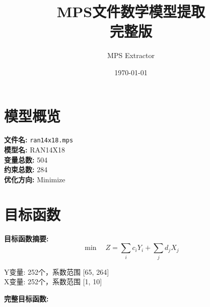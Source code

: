 \documentclass[a4paper,10pt]{article}
\title{MPS文件数学模型提取\\{\large 完整版}}
\author{MPS Extractor}
\date{\today}
\begin{document}
\maketitle
\tableofcontents
\newpage

\section{模型概览}

\textbf{文件名:} \texttt{ran14x18.mps} \\
\textbf{模型名:} RAN14X18 \\
\textbf{变量总数:} 504 \\
\textbf{约束总数:} 284 \\
\textbf{优化方向:} Minimize \\

\section{目标函数}

\textbf{目标函数摘要:}
\begin{equation}
\min \quad Z = \sum_{i} c_i Y_i + \sum_{j} d_j X_j
\end{equation}

Y变量: 252个，系数范围 [65, 264] \\
X变量: 252个，系数范围 [1, 10]

\textbf{完整目标函数:}
\end{document}
